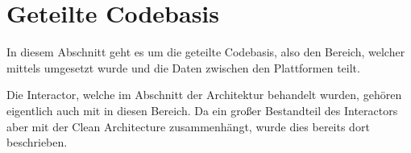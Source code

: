 \section{Geteilte Codebasis}
\label{sec:geteilte_codebasis}

In diesem Abschnitt geht es um die geteilte Codebasis, also den Bereich, welcher mittels \kmp umgesetzt wurde und die
Daten zwischen den Plattformen teilt.

Die Interactor, welche im Abschnitt der Architektur behandelt wurden, gehören eigentlich auch mit in diesen Bereich.
Da ein großer Bestandteil des Interactors aber mit der Clean Architecture zusammenhängt, wurde dies bereits dort
beschrieben.











